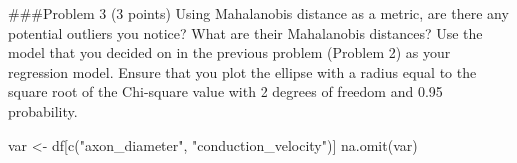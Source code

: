 \documentclass[
]{article}
\newenvironment{Shaded}{\begin{snugshade}}{\end{snugshade}}
\newcommand{\FunctionTok}[1]{\textcolor[rgb]{0.00,0.00,0.00}{#1}}
\newcommand{\NormalTok}[1]{#1}
\newcommand{\OtherTok}[1]{\textcolor[rgb]{0.56,0.35,0.01}{#1}}
\newcommand{\StringTok}[1]{\textcolor[rgb]{0.31,0.60,0.02}{#1}}
\begin{document}
\#\#\#Problem 3 (3 points) Using Mahalanobis distance as a metric, are
there any potential outliers you notice? What are their Mahalanobis
distances? Use the model that you decided on in the previous problem
(Problem 2) as your regression model. Ensure that you plot the ellipse
with a radius equal to the square root of the Chi-square value with 2
degrees of freedom and 0.95 probability.

\begin{Shaded}
\begin{Highlighting}[]
\NormalTok{var }\OtherTok{\textless{}{-}}\NormalTok{ df[}\FunctionTok{c}\NormalTok{(}\StringTok{"axon\_diameter"}\NormalTok{, }\StringTok{"conduction\_velocity"}\NormalTok{)]}
\FunctionTok{na.omit}\NormalTok{(var)}
\end{Highlighting}
\end{Shaded}
\end{document}
